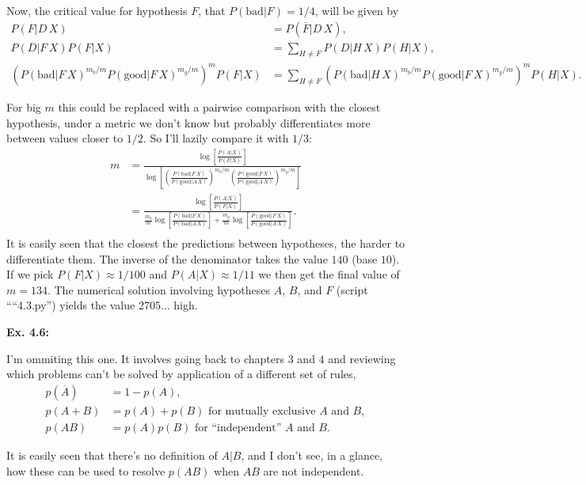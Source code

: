 \documentclass{article}
\begin{document}
Now, the critical value for hypothesis $F$, that $P(\text{bad}|F)=1/4$, will be given by
\begin{align*}
	P(F|D\,X)&=P(\overline F|D\,X),\\
	P(D|F\,X)P(F|X)&=\sum_{H\neq F}P(D|H\,X)P(H|X),\\
	\left(P(\text{bad}|F\,X)^{m_b/m}P(\text{good}|F\,X)^{m_g/m}\right)^mP(F|X)&=\sum_{H\neq F}\left(P(\text{bad}|H\,X)^{m_b/m}P(\text{good}|F\,X)^{m_g/m}\right)^mP(H|X).
\end{align*}

For big $m$ this could be replaced with a pairwise comparison with the closest hypothesis, under a metric we don't know but probably differentiates more between values closer to $1/2$. So I'll lazily compare it with $1/3$:
\begin{align*}
	m&=\frac{\log\left[\frac{P(A|X)}{P(F|X)}\right]}{\log\left[\left(\frac{P(\text{bad}|F\,X)}{P(\text{good}|A\,X)}\right)^{m_b/m}\left(\frac{P(\text{good}|F\,X)}{P(\text{good}|A\,X)}\right)^{m_g/m}\right]}\\
	&=\frac{\log\left[\frac{P(A|X)}{P(F|X)}\right]}{\frac{m_b}m\log\left[\frac{P(\text{bad}|F\,X)}{P(\text{bad}|A\,X)}\right]+\frac{m_g}m\log\left[\frac{P(\text{good}|F\,X)}{P(\text{good}|A\,X)}\right]}.\\
\end{align*}
It is easily seen that the closest the predictions between hypotheses, the harder to differentiate them. The inverse of the denominator takes the value $140$ (base $10$). If we pick $P(F|X)\approx1/100$ and $P(A|X)\approx1/11$ we then get the final value of $m=134$. The numerical solution involving hypotheses $A$, $B$, and $F$ (script ````4.3.py'') yields the value $2705$... high.

\textbf{Ex. 4.6: }

I'm ommiting this one. It involves going back to chapters $3$ and $4$ and reviewing which problems can't be solved by application of a different set of rules,
\begin{align*}
	p(\overline{A})&=1-p(A),\\
	p(A+B)&=p(A)+p(B)\text{ for mutually exclusive $A$ and $B$},\\
	p(AB)&=p(A)p(B)\text{ for ``independent'' $A$ and $B$}.
\end{align*}

It is easily seen that there's no definition of $A|B$, and I don't see, in a glance, how these can be used to resolve $p(AB)$ when $AB$ are not independent.
\end{document}
